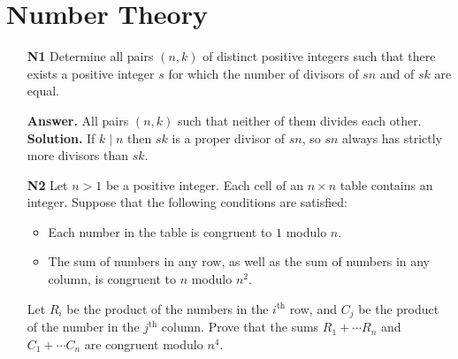 \documentclass[11pt,a4paper]{article}
\begin{document}
\section*{Number Theory}
\begin{enumerate}
	\item[\textbf{N1}] Determine all pairs $(n, k)$ of distinct positive integers such that there exists a positive integer $s$ for which the number of divisors of $sn$ and of $sk$ are equal.
	
	\textbf{Answer.} All pairs $(n, k)$ such that neither of them divides each other. \\
	\textbf{Solution.} If $k\mid n$ then $sk$ is a proper divisor of $sn$, so $sn$ always has strictly more divisors than $sk$. 
	
	\item[\textbf{N2}] Let $n>1$ be a positive integer. Each cell of an $n\times n$ table contains an integer. Suppose that the following conditions are satisfied:
	\begin{itemize}
		\item Each number in the table is congruent to $1$ modulo $n$.
		\item The sum of numbers in any row, as well as the sum of numbers in any column, is congruent to $n$ modulo $n^2$.
	\end{itemize}
	
	Let $R_i$ be the product of the numbers in the $i^{\text{th}}$ row, and $C_j$ be the product of the number in the $j^{\text{th}}$ column. Prove that the sums $R_1+\cdots R_n$ and $C_1+\cdots C_n$ are congruent modulo $n^4$.
	

\end{enumerate}
\end{document}
